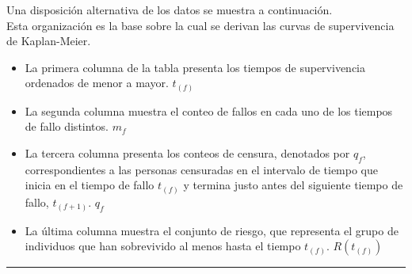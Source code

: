 \documentclass[
]{article}
\providecommand{\tightlist}{%
  \setlength{\itemsep}{0pt}\setlength{\parskip}{0pt}}
\begin{document}
\begin{tcolorbox}[enhanced jigsaw, rightrule=.15mm, toprule=.15mm, colback=white, bottomrule=.15mm, bottomtitle=1mm, left=2mm, leftrule=.75mm, arc=.35mm, breakable, title=\textcolor{quarto-callout-note-color}{\faInfo}\hspace{0.5em}{Disposición alternativa de los datos ordenados}, opacitybacktitle=0.6, colframe=quarto-callout-note-color-frame, opacityback=0, toptitle=1mm, coltitle=black, titlerule=0mm, colbacktitle=quarto-callout-note-color!10!white]

Una disposición alternativa de los datos se muestra a continuación.\\
Esta organización es la base sobre la cual se derivan las curvas de
supervivencia de Kaplan-Meier.

\begin{itemize}
\tightlist
\item
  La primera columna de la tabla presenta los tiempos de supervivencia
  ordenados de menor a mayor. \(t_{(f)}\)
\item
  La segunda columna muestra el conteo de fallos en cada uno de los
  tiempos de fallo distintos. \(m_{f}\)
\item
  La tercera columna presenta los conteos de censura, denotados por
  \(q_f\), correspondientes a las personas censuradas en el intervalo de
  tiempo que inicia en el tiempo de fallo \(t_{(f)}\) y termina justo
  antes del siguiente tiempo de fallo, \(t_{(f+1)}\). \(q_{f}\)
\item
  La última columna muestra el conjunto de riesgo, que representa el
  grupo de individuos que han sobrevivido al menos hasta el tiempo
  \(t_{(f)}\). \(R(t_{(f)})\)
\end{itemize}

\end{tcolorbox}

\begin{center}\rule{0.5\linewidth}{0.5pt}\end{center}
\end{document}
